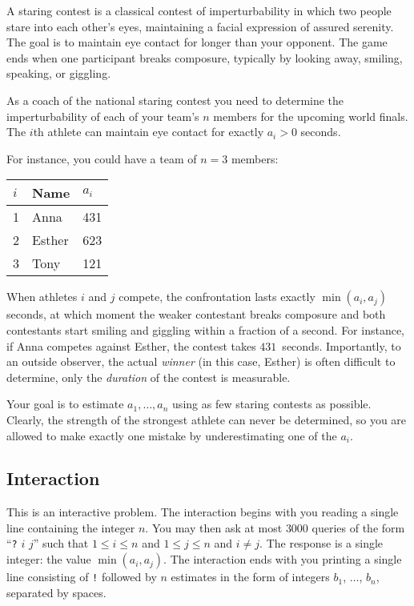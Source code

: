 

A staring contest is a classical contest of imperturbability in which two people stare into each other's eyes, maintaining a facial expression of assured serenity.
The goal is to maintain eye contact for longer than your opponent.
The game ends when one participant breaks composure, typically by looking away, smiling, speaking, or giggling.

As a coach of the national staring contest you need to determine the imperturbability of each of your team's $n$ members for the upcoming world finals.
The $i$th athlete can maintain eye contact for exactly $a_i > 0$ seconds.

For instance, you could have a team of $n=3$ members:

\medskip
\begin{tabular}{lll}
  $i$ & Name & $a_i$\\\hline
  1 & Anna &  431 \\
  2 & Esther & 623 \\
  3 & Tony &  121\\
\end{tabular}

\medskip
When athletes $i$ and $j$ compete, the confrontation lasts exactly $\min(a_i, a_j)$ seconds, at which moment the weaker contestant breaks composure and both contestants start smiling and giggling within a fraction of a second.
For instance, if Anna competes against Esther, the contest takes $431$~seconds.
Importantly, to an outside observer, the actual \emph{winner} (in this case, Esther) is often difficult to determine, only the \emph{duration} of the contest is measurable.

Your goal is to estimate $a_1,\ldots, a_n$ using as few staring contests as possible.
Clearly, the strength of the strongest athlete can never be determined, so you are allowed to make exactly one mistake by underestimating one of the $a_i$.

\subsection*{Interaction}

This is an interactive problem.
The interaction begins with you reading a single line containing the integer $n$.
You may then ask at most $3000$ queries of the form ``\texttt{?} $i$ $j$'' such that $1\leq i\leq n$ and $1\leq j\leq n$ and $i\neq j$.
The response is a single integer: the value $\min(a_i, a_j)$.
The interaction ends with you printing a single line consisting of \texttt{!} followed by $n$ estimates in the form of integers $b_1$, $\ldots$, $b_n$, separated by spaces.

